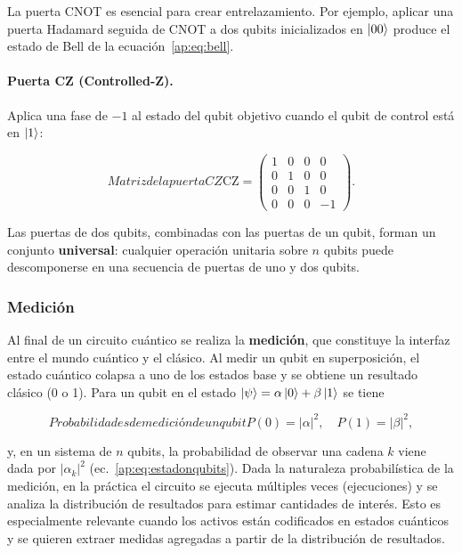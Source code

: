 La puerta CNOT es esencial para crear entrelazamiento. Por ejemplo, aplicar una puerta Hadamard seguida de CNOT a dos qubits inicializados en $\ket{00}$ produce el estado de Bell de la ecuación~\eqref{ap:eq:bell}.

\paragraph{Puerta CZ (Controlled-Z).} Aplica una fase de $-1$ al estado del qubit objetivo cuando el qubit de control está en $\ket{1}$:

\begin{equation}{Matriz de la puerta CZ}
\text{CZ} = \begin{pmatrix} 1 & 0 & 0 & 0 \\ 0 & 1 & 0 & 0 \\ 0 & 0 & 1 & 0 \\ 0 & 0 & 0 & -1 \end{pmatrix}.
\end{equation}

Las puertas de dos qubits, combinadas con las puertas de un qubit, forman un conjunto \textbf{universal}: cualquier operación unitaria sobre $n$ qubits puede descomponerse en una secuencia de puertas de uno y dos qubits.

\subsubsection{Medición}
\label{ap:subsubsec:medicion}

Al final de un circuito cuántico se realiza la \textbf{medición}, que constituye la interfaz entre el mundo cuántico y el clásico. Al medir un qubit en superposición, el estado cuántico colapsa a uno de los estados base y se obtiene un resultado clásico (0 o 1). Para un qubit en el estado $\ket{\psi}=\alpha\ket{0}+\beta\ket{1}$ se tiene

\begin{equation}{Probabilidades de medición de un qubit}
P(0)=|\alpha|^2, \quad P(1)=|\beta|^2,
\end{equation}

y, en un sistema de $n$ qubits, la probabilidad de observar una cadena $k$ viene dada por $|{\alpha}_k|^2$ (ec.~\eqref{ap:eq:estadonqubits}). Dada la naturaleza probabilística de la medición, en la práctica el circuito se ejecuta múltiples veces (ejecuciones) y se analiza la distribución de resultados para estimar cantidades de interés. Esto es especialmente relevante cuando los activos están codificados en estados cuánticos y se quieren extraer medidas agregadas a partir de la distribución de resultados.

